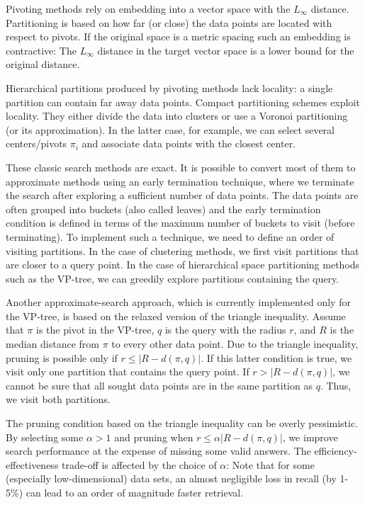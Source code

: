 \documentclass[runningheads,a4paper]{llncs}
\begin{document}
{Pivoting methods rely on embedding into a vector space with the $L_{\infty}$ distance.
Partitioning is based on how far (or close) the data points are located with respect to pivots.
If the original space is a metric spacing such an embedding is contractive:
The $L_{\infty}$ distance in the target vector space is a lower bound for the original distance.

Hierarchical partitions produced by pivoting methods lack locality: a single partition can contain
far away data points. Compact partitioning schemes exploit locality.
They either divide the data into clusters or use a Voronoi partitioning (or its approximation).
In the latter case, for example, we can select several centers/pivots $\pi_i$ and associate 
data points with the closest center.

These classic search methods are exact. It is possible to convert most of them to approximate
methods using an early termination technique,
where we terminate the search after exploring a sufficient number of data points.
The data points are often grouped into buckets (also called leaves) and 
the early termination condition is defined in terms of 
the maximum number of buckets to visit (before terminating).
To implement such a technique, we need to define an order of visiting partitions.
In the case of clustering methods, we first visit partitions that are closer to a query point.
In the case of hierarchical space partitioning methods such as the VP-tree,
we can greedily explore partitions containing the query.

Another approximate-search approach, 
which is currently implemented only for the VP-tree, 
is based on the relaxed version of the triangle inequality.
Assume that $\pi$ is the pivot in the VP-tree, $q$ is the query with the radius $r$, 
and $R$ is the median distance from $\pi$ to every other data point.
Due to the triangle inequality, pruning is possible only if $r \le |R - d(\pi, q)|$. 
If this latter condition is true, 
we visit only one partition that contains the query point.
If $r > |R - d(\pi, q)|$, we cannot be sure that all sought data points 
are in the same partition as $q$. Thus, we visit both partitions.

The pruning condition based on the triangle inequality can be overly pessimistic.
By selecting some $\alpha > 1$ and pruning when $r \le \alpha |R - d(\pi, q)|$,
we improve search performance at the expense of missing some valid answers.
The efficiency-effectiveness trade-off is affected by the choice of $\alpha$:
Note that for some (especially low-dimensional) data sets, an almost negligible 
loss in recall (by 1-5\%) can lead to an order of magnitude faster retrieval.

}
\end{document}

